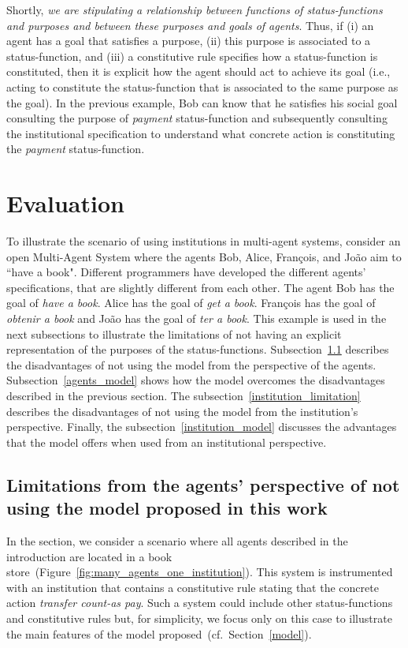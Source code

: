 \documentclass[runningheads]{llncs}
\begin{document}
Shortly, \textit{we are stipulating a relationship between functions of status-functions and purposes and between these purposes and goals of agents}.
Thus, if (i) an agent has a goal that satisfies a purpose, (ii) this purpose is associated to a status-function, and (iii) a constitutive rule specifies how a status-function is constituted, then it is explicit how the agent should act to achieve its goal (i.e., acting to constitute the status-function that is associated to the same purpose as the goal).
In the previous example, Bob can know that he satisfies his social goal consulting the purpose of \emph{payment} status-function and subsequently consulting the institutional specification to understand what concrete action is constituting the \emph{payment} status-function.  


\section{Evaluation}
\label{evaluation}

To illustrate the scenario of using institutions in multi-agent systems, consider an open Multi-Agent System where the agents Bob, Alice, François, and João aim to ``have a book". Different programmers have developed the different agents' specifications, that are slightly different from each other. The agent Bob has the goal of \emph{have a book}. Alice has the goal of \emph{get a book}. François has the goal of \emph{obtenir a book} and João has the goal of \emph{ter a book}. 
This example is used in the next subsections to illustrate the limitations of not having an explicit representation of the purposes of the status-functions. Subsection~\ref{agents_limitation} describes the disadvantages of not using the model from the perspective of the agents. Subsection~\ref{agents_model} shows how the model overcomes the disadvantages described in the previous section. The subsection~\ref{institution_limitation} describes the disadvantages of not using the model from the institution's perspective. Finally, the subsection~\ref{institution_model} discusses the advantages that the model offers when used from an institutional perspective.


\subsection{Limitations from the agents' perspective of not using the model proposed in this work}
\label{agents_limitation}

In the section, we consider a scenario where all agents described in the introduction are located in a book store~(Figure~\ref{fig:many_agents_one_institution}). This system is instrumented with an institution that contains a constitutive rule stating that the concrete action \emph{transfer count-as pay}. Such a system could include other status-functions and constitutive rules but, for simplicity, we focus only on this case to illustrate the main features of the model proposed~(cf.~Section~\ref{model}).
 
\end{document}
